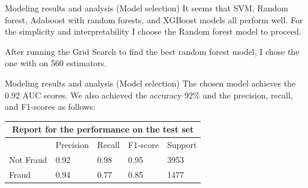 \documentclass[aspectratio=169,xcolor=dvipsnames]{beamer}
\begin{document}
\begin{frame}{Modeling results and analysis (Model selection)}
It seems that SVM, Random forest, Adaboost with random forests, and XGBoost models all perform well. For the simplicity and interpretability I choose the Random forest model to proceed.

\text{ }

After running the Grid Search to find the best random forest model, I chose the one with on 560 estimators.
\end{frame}

\begin{frame}{Modeling results and analysis (Model selection)}
The chosen model achieves the 0.92 AUC scores. We also achieved the accuracy 92\% and the precision, recall, and F1-scores as follows:

\text{ }

\text{ }

\begin{center}
\begin{tabular}{ |p{2cm}||p{2cm}|p{2cm}|p{2cm}|p{2cm}|  }
 \hline
 \multicolumn{5}{|c|}{Report for the performance on the test set} \\
 \hline
\text{ }& Precision & Recall & F1-score & Support\\
 \hline
 Not Fraud   & 0.92    &0.98&   0.95 & 3953\\
 Fraud  &   0.94  & 0.77   &0.85& 1477\\
 \hline
\end{tabular}
\end{center}

\end{frame}
\end{document}
